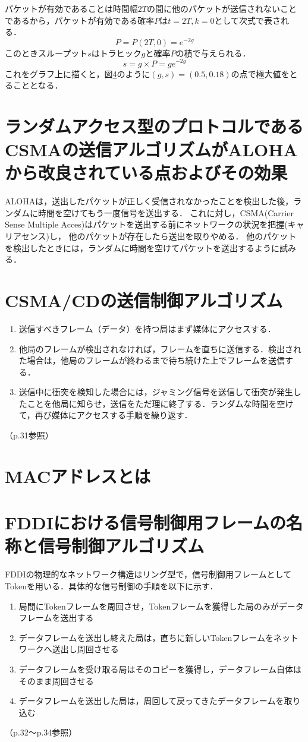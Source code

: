 \documentclass[10.5pt]{jsarticle}
\begin{document}
パケットが有効であることは時間幅$2T$の間に他のパケットが送信されないことであるから，パケットが有効である確率$P$は$t=2T, k=0$として次式で表される．
\[P = P(2T, 0) = e^{-2g}\]
このときスループット$s$はトラヒック$g$と確率$P$の積で与えられる．
\[s = g \times P = ge^{-2g}\]
これをグラフ上に描くと，図\ref{}のように$(g, s) = (0.5, 0.18)$の点で極大値をとることとなる．

\section{ランダムアクセス型のプロトコルであるCSMAの送信アルゴリズムがALOHAから改良されている点およびその効果}
ALOHAは，送出したパケットが正しく受信されなかったことを検出した後，ランダムに時間を空けてもう一度信号を送出する．
これに対し，CSMA(Carrier Sense Multiple Acces)はパケットを送出する前にネットワークの状況を把握(キャリアセンス)し，
他のパケットが存在したら送出を取りやめる．
他のパケットを検出したときには，ランダムに時間を空けてパケットを送出するように試みる．

\section{CSMA/CDの送信制御アルゴリズム}
\begin{enumerate}
 \item 送信すべきフレーム（データ）を持つ局はまず媒体にアクセスする．
 \item 他局のフレームが検出されなければ，フレームを直ちに送信する．検出された場合は，他局のフレームが終わるまで待ち続けた上でフレームを送信する．
 \item 送信中に衝突を検知した場合には，ジャミング信号を送信して衝突が発生したことを他局に知らせ，送信をただ理に終了する．ランダムな時間を空けて，再び媒体にアクセスする手順を繰り返す．
\end{enumerate}
（p.31参照）

\section{MACアドレスとは}



\section{FDDIにおける信号制御用フレームの名称と信号制御アルゴリズム}
FDDIの物理的なネットワーク構造はリング型で，信号制御用フレームとしてTokenを用いる．具体的な信号制御の手順を以下に示す．
\begin{enumerate}
\item 局間にTokenフレームを周回させ，Tokenフレームを獲得した局のみがデータフレームを送出する
\item データフレームを送出し終えた局は，直ちに新しいTokenフレームをネットワークへ送出し周回させる
\item データフレームを受け取る局はそのコピーを獲得し，データフレーム自体はそのまま周回させる
\item データフレームを送出した局は，周回して戻ってきたデータフレームを取り込む
\end{enumerate}
（p.32～p.34参照）
\end{document}
